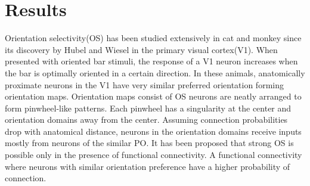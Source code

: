 \section{Results}
Orientation selectivity(OS) has been studied extensively in cat and monkey since its discovery by Hubel and Wiesel in the primary visual cortex(V1). When presented with oriented bar stimuli, the response of a V1 neuron increases when the bar is optimally oriented in a certain direction. In these animals, anatomically proximate neurons in the V1 have very similar preferred orientation forming orientation maps. Orientation maps consist of OS neurons are neatly arranged to form pinwheel-like patterns. Each pinwheel has a singularity at the center and orientation domains away from the center. Assuming connection probabilities drop with anatomical distance, neurons in the orientation domains receive inputs mostly from neurons of the similar PO. It has been proposed that strong OS is possible only in the presence of functional connectivity. A functional connectivity where neurons with similar orientation preference have a higher probability of connection.\\
